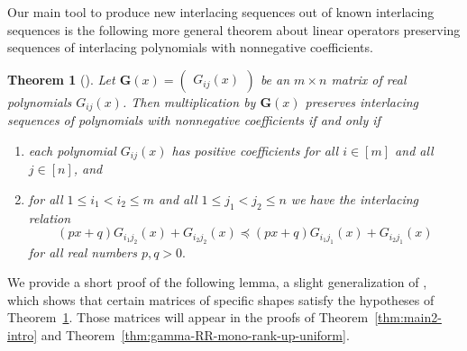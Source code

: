 \documentclass[11pt,a4paper]{amsart}
\theoremstyle{results}
\newtheorem{thm}{Theorem}[section]
\newtheorem{lemma}[thm]{Lemma}
\theoremstyle{definitions}
\def\R{\mathbb{R}}
\begin{document}
Our main tool to produce new interlacing sequences out of known interlacing sequences is the following more general theorem about linear operators preserving sequences of interlacing polynomials with nonnegative coefficients. 
\begin{thm}[{\cite[Theorem~7.8.5]{branden2015unimodality}}]
\label{thm:interlacing}
    Let $\mathbf{G}(x) = \begin{pmatrix}G_{ij}(x) \end{pmatrix}$ be an $m\times n$ matrix of real polynomials $G_{ij}(x)$. Then multiplication by $\mathbf{G}(x)$ preserves interlacing sequences of polynomials with nonnegative coefficients if and only if 
    \begin{enumerate}[\normalfont (i)]
        \item each polynomial $G_{ij}(x)$ has positive coefficients for all $i \in [m]$ and all $j \in [n]$, and 
        \item for all $1 \leqslant i_1 < i_2 \leqslant m$ and all $1 \leqslant j_1 < j_2 \leqslant n$ we have the interlacing relation 
        \begin{equation*}
            (p x + q)G_{i_1j_2}(x) + G_{i_2j_2}(x) \preceq (p x + q)G_{i_1j_1}(x) + G_{i_2 j_1}(x)
        \end{equation*}
        for all real numbers $p, q >0.$
    \end{enumerate}
\end{thm}

We provide a short proof of the following lemma, a slight generalization of  \cite[Corollary 7.8.7]{branden2015unimodality}, which shows that certain matrices of specific shapes satisfy the hypotheses of Theorem~\ref{thm:interlacing}. Those matrices will appear in the proofs of Theorem~\ref{thm:main2-intro} and Theorem~\ref{thm:gamma-RR-mono-rank-up-uniform}. 
\end{document}
